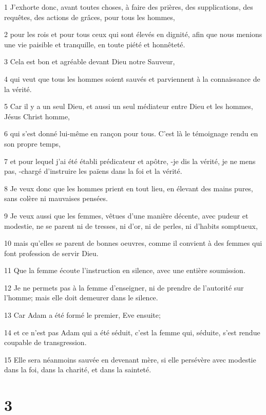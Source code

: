 \par 1 J'exhorte donc, avant toutes choses, à faire des prières, des supplications, des requêtes, des actions de grâces, pour tous les hommes,
\par 2 pour les rois et pour tous ceux qui sont élevés en dignité, afin que nous menions une vie paisible et tranquille, en toute piété et honnêteté.
\par 3 Cela est bon et agréable devant Dieu notre Sauveur,
\par 4 qui veut que tous les hommes soient sauvés et parviennent à la connaissance de la vérité.
\par 5 Car il y a un seul Dieu, et aussi un seul médiateur entre Dieu et les hommes, Jésus Christ homme,
\par 6 qui s'est donné lui-même en rançon pour tous. C'est là le témoignage rendu en son propre temps,
\par 7 et pour lequel j'ai été établi prédicateur et apôtre, -je dis la vérité, je ne mens pas, -chargé d'instruire les païens dans la foi et la vérité.
\par 8 Je veux donc que les hommes prient en tout lieu, en élevant des mains pures, sans colère ni mauvaises pensées.
\par 9 Je veux aussi que les femmes, vêtues d'une manière décente, avec pudeur et modestie, ne se parent ni de tresses, ni d'or, ni de perles, ni d'habits somptueux,
\par 10 mais qu'elles se parent de bonnes oeuvres, comme il convient à des femmes qui font profession de servir Dieu.
\par 11 Que la femme écoute l'instruction en silence, avec une entière soumission.
\par 12 Je ne permets pas à la femme d'enseigner, ni de prendre de l'autorité sur l'homme; mais elle doit demeurer dans le silence.
\par 13 Car Adam a été formé le premier, Eve ensuite;
\par 14 et ce n'est pas Adam qui a été séduit, c'est la femme qui, séduite, s'est rendue coupable de transgression.
\par 15 Elle sera néanmoins sauvée en devenant mère, si elle persévère avec modestie dans la foi, dans la charité, et dans la sainteté.

\chapter{3}

